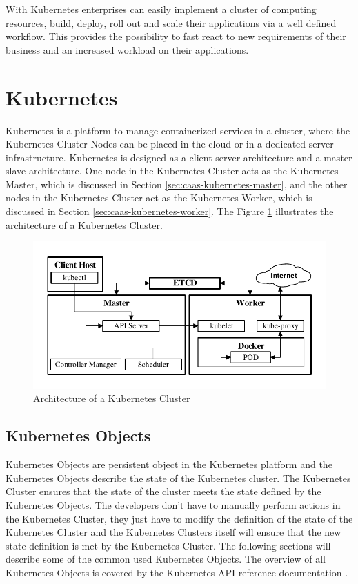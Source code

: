 With Kubernetes enterprises can easily implement a cluster of computing resources, build, deploy, roll out and scale their applications via a well defined workflow. This provides the possibility to fast react to new requirements of their business and an increased workload on their applications. 

\section{Kubernetes}
\label{sec:caas-kubernetes}
Kubernetes is a platform to manage containerized services in a cluster, where the Kubernetes Cluster-Nodes can be placed in the cloud or in a dedicated server infrastructure. Kubernetes is designed as a client server architecture and a master slave architecture. One node in the Kubernetes Cluster acts as the Kubernetes Master, which is discussed in Section \vref{sec:caas-kubernetes-master}, and the other nodes in the Kubernetes Cluster act as the Kubernetes Worker, which is discussed in Section \vref{sec:caas-kubernetes-worker}. The Figure \ref{fig:kubernetes-cluster-architecture} illustrates the architecture of a Kubernetes Cluster.

\begin{figure}[htbp]
	\centering
	\includegraphics[scale=0.9]{images/kubernetes-cluster-architecture.pdf}
	\caption{Architecture of a Kubernetes Cluster}
	\label{fig:kubernetes-cluster-architecture}
\end{figure} 

\subsection{Kubernetes Objects}
\label{sec:caas-kubernetes-objects}
Kubernetes Objects are persistent object in the Kubernetes platform and the Kubernetes Objects describe the state of the Kubernetes cluster. The Kubernetes Cluster ensures that the state of the cluster meets the state defined by the Kubernetes Objects. The developers don't have to manually perform actions in the Kubernetes Cluster, they just have to modify the definition of the state of the Kubernetes Cluster and the Kubernetes Clusters itself will ensure that the new state definition is met by the Kubernetes Cluster. The following sections will describe some of the common used Kubernetes Objects. The overview of all Kubernetes Objects is covered by the Kubernetes API reference documentation \cite{CNCFKubernetesAPI2018}. 

